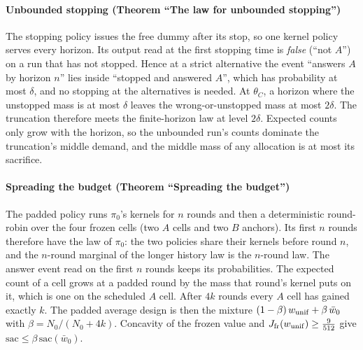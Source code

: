 
\paragraph{Unbounded stopping (Theorem ``The law for unbounded stopping'')} The stopping policy
issues the free dummy after its stop, so one kernel policy serves every horizon. Its output read
at the first stopping time is \emph{false} (``not $A$'') on a run that has not stopped. Hence at a
strict alternative the event ``answers $A$ by horizon $n$'' lies inside ``stopped and answered
$A$'', which has probability at most $\delta$, and no stopping at the alternatives is needed. At
$\theta_{C}$, a horizon where the unstopped mass is at most $\delta$ leaves the wrong-or-unstopped
mass at most $2\delta$. The truncation therefore meets the finite-horizon law at level $2\delta$.
Expected counts only grow with the horizon, so the unbounded run's counts dominate the
truncation's middle demand, and the middle mass of any allocation is at most its sacrifice.


\paragraph{Spreading the budget (Theorem ``Spreading the budget'')} The padded policy runs
$\pi_{0}$'s kernels for $n$ rounds and then a deterministic round-robin over the four frozen cells (two $A$ cells and two $B$ anchors). Its first $n$ rounds therefore have the law of $\pi_{0}$: the two policies share their
kernels before round $n$, and the $n$-round marginal of the longer history law is the $n$-round
law. The answer event read on the first $n$ rounds keeps its probabilities. The expected count of
a cell grows at a padded round by the mass that round's kernel puts on it, which is one on the
scheduled $A$ cell. After $4k$ rounds every $A$ cell has gained exactly $k$. The padded average
design is then the mixture $(1-\beta)\,w_{\rm unif}+\beta\,\bar w_{0}$ with
$\beta=N_{0}/(N_{0}+4k)$. Concavity of the frozen value and $J_{\rm fr}(w_{\rm unif})\ge\frac{9}{512}$
give $\mathrm{sac}\le\beta\,\mathrm{sac}(\bar w_{0})$.

